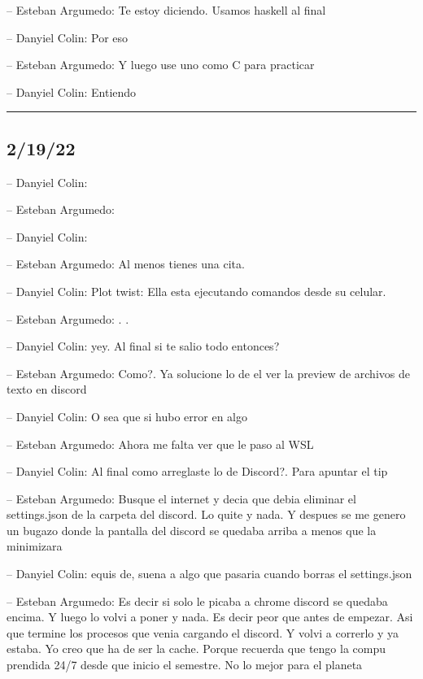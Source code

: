 -- Esteban Argumedo: Te estoy diciendo. Usamos haskell al final

-- Danyiel Colin: Por eso

-- Esteban Argumedo: Y luego use uno como C para practicar

-- Danyiel Colin: Entiendo

\begin{center}\rule{0.5\linewidth}{0.5pt}\end{center}

\hypertarget{section-11}{%
\subsection{2/19/22}\label{section-11}}

-- Danyiel Colin:

-- Esteban Argumedo:

-- Danyiel Colin:

-- Esteban Argumedo: Al menos tienes una cita.

-- Danyiel Colin: Plot twist: Ella esta ejecutando comandos desde su
celular.

-- Esteban Argumedo: . .

-- Danyiel Colin: yey. Al final si te salio todo entonces?

-- Esteban Argumedo: Como?. Ya solucione lo de el ver la preview de
archivos de texto en discord

-- Danyiel Colin: O sea que si hubo error en algo

-- Esteban Argumedo: Ahora me falta ver que le paso al WSL

-- Danyiel Colin: Al final como arreglaste lo de Discord?. Para apuntar
el tip

-- Esteban Argumedo: Busque el internet y decia que debia eliminar el
settings.json de la carpeta del discord. Lo quite y nada. Y despues se
me genero un bugazo donde la pantalla del discord se quedaba arriba a
menos que la minimizara

-- Danyiel Colin: equis de, suena a algo que pasaria cuando borras el
settings.json

-- Esteban Argumedo: Es decir si solo le picaba a chrome discord se
quedaba encima. Y luego lo volvi a poner y nada. Es decir peor que antes
de empezar. Asi que termine los procesos que venia cargando el discord.
Y volvi a correrlo y ya estaba. Yo creo que ha de ser la cache. Porque
recuerda que tengo la compu prendida 24/7 desde que inicio el semestre.
No lo mejor para el planeta

